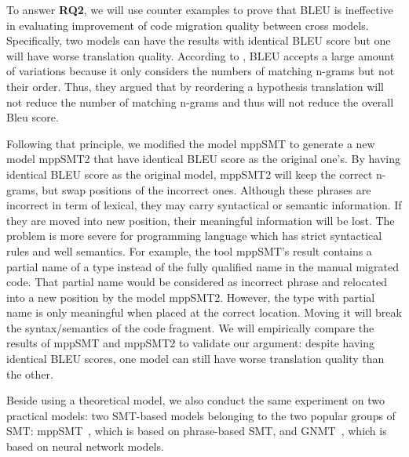To answer {\bf RQ2}, we will use counter examples to prove that BLEU is ineffective in evaluating improvement of code migration quality between cross models. Specifically, two models can have the results with identical BLEU score but one will have worse translation quality.
According to \cite{Callison}, BLEU accepts a large amount of variations because it only considers the numbers of matching n-grams but not their order. Thus, they argued that by reordering a hypothesis translation will not reduce the number of matching n-grams and thus will not reduce the overall Bleu
score. 

Following that principle, we modified the model mppSMT to generate a new model mppSMT2 that have identical BLEU score as the original one's. By having identical BLEU score as the original model, mppSMT2 will keep the correct n-grams, but swap positions of the incorrect ones. Although these phrases are incorrect in term of lexical, they may carry syntactical or semantic information. If they are moved into new position, their meaningful information will be lost. The problem is more severe for programming language which has strict syntactical rules and well semantics. For example, the tool mppSMT's result contains a partial name of a type instead of the fully qualified name in the manual migrated code. That partial name would be considered as incorrect phrase and relocated into a new position by the model mppSMT2. However, the type with partial name is only meaningful when placed at the correct location. Moving it will break the syntax/semantics of the code fragment.
We will empirically compare the results of mppSMT and mppSMT2 to validate our argument: despite having identical BLEU scores, one model can still have worse translation quality than the other.

Beside using a theoretical model, we also conduct the same experiment on two practical models: two SMT-based models belonging to the two popular groups of SMT: mppSMT~\cite{ase15}, which is based on phrase-based SMT, and GNMT~\cite{gnmt}, which is based on neural network models. 




